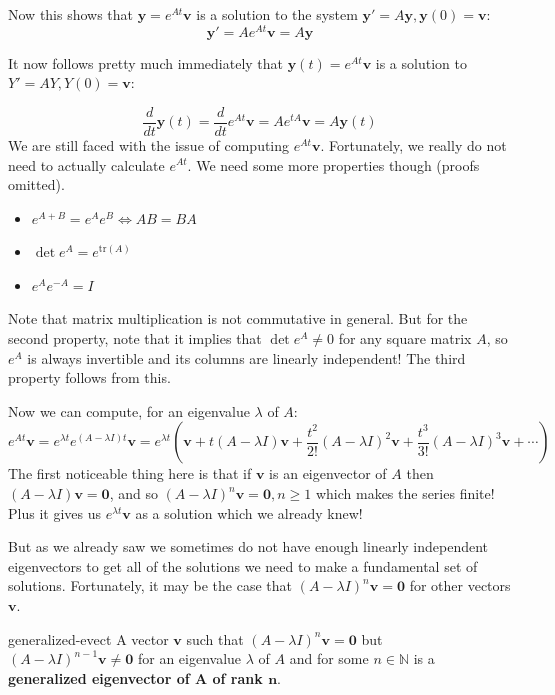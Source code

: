 \documentclass[letterpaper, 11pt, openany]{book}
\theoremstyle{mytheoremstyle}
\theoremstyle{myexamplestyle}
\begin{document}
Now this shows that \(\mathbf{y} = e^{At}\mathbf{v}\) is a solution to the system \(\mathbf{y}' = A \mathbf{y}, \mathbf{y}(0) = \mathbf{v}\):
\[\mathbf{y}' = Ae^{At}\mathbf{v} = A \mathbf{y}\]


It now follows pretty much immediately that \(\mathbf{y}(t) = e^{At}\mathbf{v}\) is a solution to \(Y' = AY, Y(0) = \mathbf{v}\):

\[\frac{d}{dt} \mathbf{y}(t) = \frac{d}{dt} e^{At}\mathbf{v} = Ae^{tA}\mathbf{v} = A\mathbf{y}(t)\]
We are still faced with the issue of computing \(e^{At}\mathbf{v}\). Fortunately, we really do not need to actually calculate \(e^{At}\). We need some more properties though (proofs omitted).
\begin{itemize}
    \item \(e^{A+B}=e^{A}e^{B} \Leftrightarrow AB = BA\)
    \item \(\det e^{A} = e^{\text{tr} (A)}\)
    \item \(e^{A}e^{-A} = I\)
\end{itemize}
Note that matrix multiplication is not commutative in general. But for the second property, note that it implies that \(\det e^{A} \neq 0\) for any square matrix \(A\), so \(e^{A}\) is always invertible and its columns are linearly independent! The third property follows from this.

Now we can compute, for an eigenvalue \(\lambda\) of \(A\):
\[e^{At}\mathbf{v} = e^{\lambda t} e^{(A-\lambda I)t} \mathbf{v} = e^{\lambda t}\left(\mathbf{v} + t(A - \lambda I)\mathbf{v} + \frac{t^{2}}{2!}(A - \lambda I)^{2}\mathbf{v} + \frac{t^{3}}{3!}(A - \lambda I)^{3}\mathbf{v} + \cdots\right)\]
The first noticeable thing here is that if \(\mathbf{v}\) is an eigenvector of \(A\) then \((A - \lambda I)\mathbf{v} = \bm{0}\), and so \((A - \lambda I)^{n}\mathbf{v} = \bm{0}, n \geq 1\) which makes the series finite! Plus it gives us \(e^{\lambda t}\mathbf{v}\) as a solution which we already knew!

But as we already saw we sometimes do not have enough linearly independent eigenvectors to get all of the solutions we need to make a fundamental set of solutions. Fortunately, it may be the case that \((A - \lambda I)^{n}\mathbf{v} = \bm{0}\) for other vectors \(\mathbf{v}\).

\begin{definition}{}{generalized-evect}
    A vector \(\mathbf{v}\) such that \((A - \lambda I)^{n}\mathbf{v} = \bm{0}\) but \((A - \lambda I)^{n-1}\mathbf{v} \neq \bm{0}\) for an eigenvalue \(\lambda\) of \(A\) and for some \(n \in \mathbb{N}\) is a \textbf{generalized eigenvector of \(\bm{A}\) of rank \(\bm{n}\)}.
\end{definition}
\end{document}
